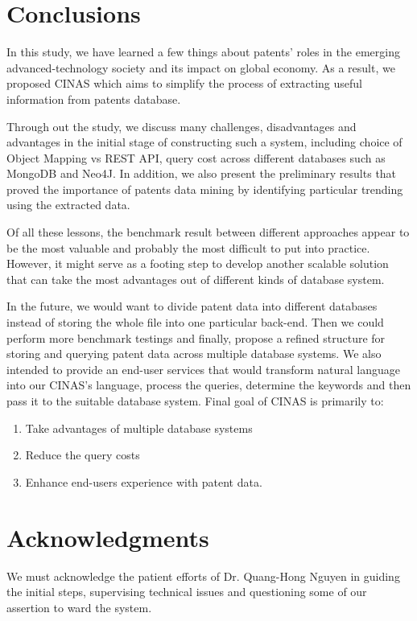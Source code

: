 \documentclass{sig-alternate}
\begin{document}
{\section{Conclusions}
In this study, we have learned a few things about patents' roles in the emerging advanced-technology society and its impact on global economy. As a result, we proposed CINAS which aims to simplify the process of extracting useful information from patents database. 

Through out the study, we discuss many challenges, disadvantages and advantages in the initial stage of constructing such a system, including choice of Object Mapping vs REST API, query cost across different databases such as MongoDB and Neo4J. In addition, we also present the preliminary results that proved the importance of patents data mining by identifying particular trending using the extracted data.

Of all these lessons, the benchmark result between different approaches appear to be the most valuable and probably the most difficult to put into practice. However, it might serve as a footing step to develop another scalable solution that can take the most advantages out of different kinds of database system.

In the future, we would want to divide patent data into different databases instead of storing the whole file into one particular back-end. Then we could perform more benchmark testings and finally, propose a refined structure for storing and querying patent data across multiple database systems. We also intended to provide an end-user services that would transform natural language into our CINAS's language, process the queries, determine the keywords and then pass it to the suitable database system. Final goal of CINAS is primarily to:
\begin{enumerate}
 \item Take advantages of multiple database systems
 \item Reduce the query costs
 \item Enhance end-users experience with patent data.
\end{enumerate}

\section{Acknowledgments}
We must acknowledge the patient efforts of Dr. Quang-Hong Nguyen in guiding the initial steps, supervising technical issues and questioning some of our assertion to ward the system.

}
\end{document}
